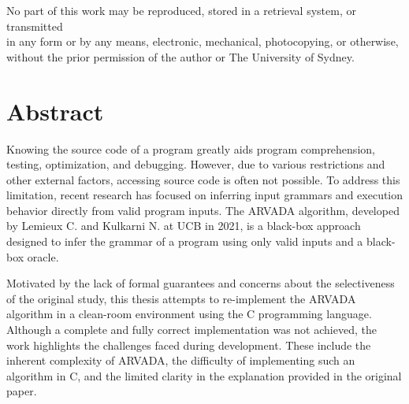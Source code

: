 \onehalfspacing

\restoregeometry
\onehalfspacing

\clearpage\null\thispagestyle{empty}
\begin{center}
    \vspace*{\fill}
    
    
    No part of this work may be reproduced, stored in a retrieval system, or transmitted \\
    in any form or by any means, electronic, mechanical, photocopying, or otherwise, \\
    without the prior permission of the author or The University of Sydney.
\end{center}

\chapter*{Abstract}
Knowing the source code of a program greatly aids program comprehension, testing, optimization, and debugging. However, due to various restrictions and other external factors, accessing source code is often not possible. To address this limitation, recent research has focused on inferring input grammars and execution behavior directly from valid program inputs. The ARVADA algorithm, developed by Lemieux C. and Kulkarni N. at UCB in 2021, is a black-box approach designed to infer the grammar of a program using only valid inputs and a black-box oracle.

Motivated by the lack of formal guarantees and concerns about the selectiveness of the original study, this thesis attempts to re-implement the ARVADA algorithm in a clean-room environment using the C programming language. Although a complete and fully correct implementation was not achieved, the work highlights the challenges faced during development. These include the inherent complexity of ARVADA, the difficulty of implementing such an algorithm in C, and the limited clarity in the explanation provided in the original paper.


\newpage\thispagestyle{empty}
\tableofcontents